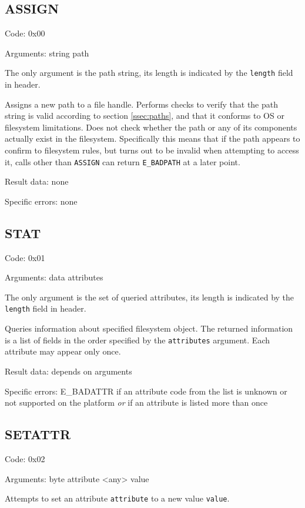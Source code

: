 \subsection{ASSIGN}

Code: 0x00

Arguments:
string path

The only argument is the path string, its length is indicated by the {\tt length} field in header.

Assigns a new path to a file handle. Performs checks to verify that the path string is valid according to
section \ref{ssec:paths}, and that it conforms to OS or filesystem limitations. Does not check whether the
path or any of its components actually exist in the filesystem. Specifically this means that if the path
appears to confirm to filesystem rules, but turns out to be invalid when attempting to access it, calls other
than {\tt ASSIGN} can return {\tt E\_BADPATH} at a later point.

Result data: none

Specific errors: none

\subsection{STAT}

Code: 0x01

Arguments:
data attributes

The only argument is the set of queried attributes, its length is indicated by the {\tt length} field in
header.

Queries information about specified filesystem object. The returned information is a list of fields in the
order specified by the {\tt attributes} argument. Each attribute may appear only once.

Result data: depends on arguments

Specific errors:
	E\_BADATTR if an attribute code from the list is unknown or not supported on the platform
		{\it or} if an attribute is listed more than once

\subsection{SETATTR}

Code: 0x02

Arguments:
byte attribute
<any> value

Attempts to set an attribute {\tt attribute} to a new value {\tt value}.

